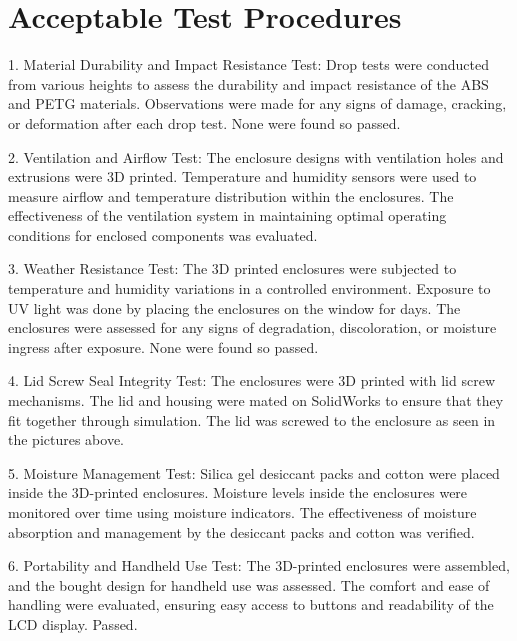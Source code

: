 \documentclass[class=report,11pt,crop=false]{standalone}
\begin{document}
 

\section{Acceptable Test Procedures}
 
1. Material Durability and Impact Resistance Test:
 Drop tests were conducted from various heights to assess the durability and impact resistance of the ABS and PETG materials. Observations were made for any signs of damage, cracking, or deformation after each drop test. None were found so passed. 
 \newline
 

2. Ventilation and Airflow Test:
    The enclosure designs with ventilation holes and extrusions were 3D printed. Temperature and humidity sensors were used to measure airflow and temperature distribution within the enclosures.
    The effectiveness of the ventilation system in maintaining optimal operating conditions for enclosed components was evaluated.
    \newline

3. Weather Resistance Test:
    The 3D printed enclosures were subjected to temperature and humidity variations in a controlled environment. Exposure to UV light was done by placing the enclosures on the window for days. The enclosures were assessed for any signs of degradation, discoloration, or moisture ingress after exposure. None were found so passed.
    \newline

4. Lid Screw Seal Integrity Test:
    The enclosures were 3D printed with lid screw mechanisms. The lid and housing were mated on SolidWorks to ensure that they fit together through simulation. The lid was screwed to the enclosure as seen in the pictures above.
    \newline
    

5. Moisture Management Test:
 Silica gel desiccant packs and cotton were placed inside the 3D-printed enclosures. Moisture levels inside the enclosures were monitored over time using moisture indicators. The effectiveness of moisture absorption and management by the desiccant packs and cotton was verified.
\newline

6. Portability and Handheld Use Test:
The 3D-printed enclosures were assembled, and the bought design for handheld use was assessed. The comfort and ease of handling were evaluated, ensuring easy access to buttons and readability of the LCD display. Passed.
\newline
\end{document}
